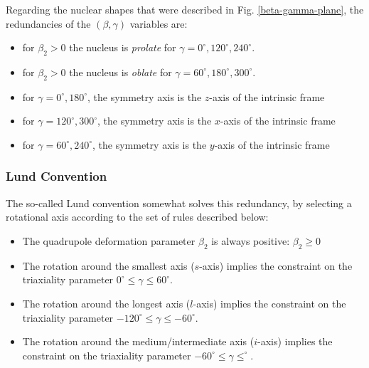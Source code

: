 Regarding the nuclear shapes that were described in Fig. \ref{beta-gamma-plane}, the redundancies of the $(\beta,\gamma)$ variables are:
\begin{itemize}
    \item for $\beta_2>0$ the nucleus is \emph{prolate} for $\gamma=0^\circ,120^\circ,240^\circ$.
    \item for $\beta_2>0$ the nucleus is \emph{oblate} for $\gamma=60^\circ,180^\circ,300^\circ$.
    \item for $\gamma=0^\circ,180^\circ$, the symmetry axis is the $z$-axis of the intrinsic frame
    \item for $\gamma=120^\circ,300^\circ$, the symmetry axis is the $x$-axis of the intrinsic frame
    \item for $\gamma=60^\circ,240^\circ$, the symmetry axis is the $y$-axis of the intrinsic frame
\end{itemize}

\subsubsection{Lund Convention}

The so-called Lund convention \cite{andersson1976nuclear} somewhat solves this redundancy, by selecting a rotational axis according to the set of rules described below:
\begin{itemize}
    \item The quadrupole deformation parameter $\beta_2$ is always positive: $\beta_2\geq 0 $
    \item The rotation around the smallest axis ($s$-axis) implies the constraint on the triaxiality parameter $0^\circ\leq\gamma\leq60^\circ$.
    \item The rotation around the longest axis ($l$-axis) implies the constraint on the triaxiality parameter $-120^\circ\leq\gamma\leq-60^\circ$.
    \item The rotation around the medium/intermediate axis ($i$-axis) implies the constraint on the triaxiality parameter $-60^\circ\leq\gamma\leq^\circ$.
\end{itemize}

